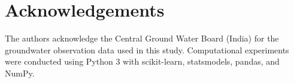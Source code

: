 \documentclass[conference]{IEEEtran}
\begin{document}
\section*{Acknowledgements}
The authors acknowledge the Central Ground Water Board (India) for the
groundwater observation data used in this study.
Computational experiments were conducted using Python 3 with scikit-learn,
statsmodels, pandas, and NumPy.



\end{document}
